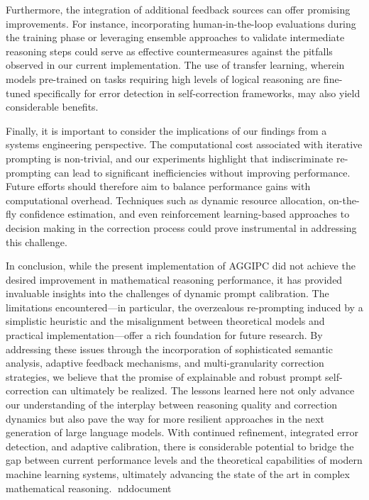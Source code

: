 \documentclass[11pt]{article}
\begin{document}
Furthermore, the integration of additional feedback sources can offer promising improvements. For instance, incorporating human-in-the-loop evaluations during the training phase or leveraging ensemble approaches to validate intermediate reasoning steps could serve as effective countermeasures against the pitfalls observed in our current implementation. The use of transfer learning, wherein models pre-trained on tasks requiring high levels of logical reasoning are fine-tuned specifically for error detection in self-correction frameworks, may also yield considerable benefits.

Finally, it is important to consider the implications of our findings from a systems engineering perspective. The computational cost associated with iterative prompting is non-trivial, and our experiments highlight that indiscriminate re-prompting can lead to significant inefficiencies without improving performance. Future efforts should therefore aim to balance performance gains with computational overhead. Techniques such as dynamic resource allocation, on-the-fly confidence estimation, and even reinforcement learning-based approaches to decision making in the correction process could prove instrumental in addressing this challenge.

In conclusion, while the present implementation of AGGIPC did not achieve the desired improvement in mathematical reasoning performance, it has provided invaluable insights into the challenges of dynamic prompt calibration. The limitations encountered—in particular, the overzealous re-prompting induced by a simplistic heuristic and the misalignment between theoretical models and practical implementation—offer a rich foundation for future research. By addressing these issues through the incorporation of sophisticated semantic analysis, adaptive feedback mechanisms, and multi-granularity correction strategies, we believe that the promise of explainable and robust prompt self-correction can ultimately be realized. The lessons learned here not only advance our understanding of the interplay between reasoning quality and correction dynamics but also pave the way for more resilient approaches in the next generation of large language models. With continued refinement, integrated error detection, and adaptive calibration, there is considerable potential to bridge the gap between current performance levels and the theoretical capabilities of modern machine learning systems, ultimately advancing the state of the art in complex mathematical reasoning.
nd{document}
\end{document}
